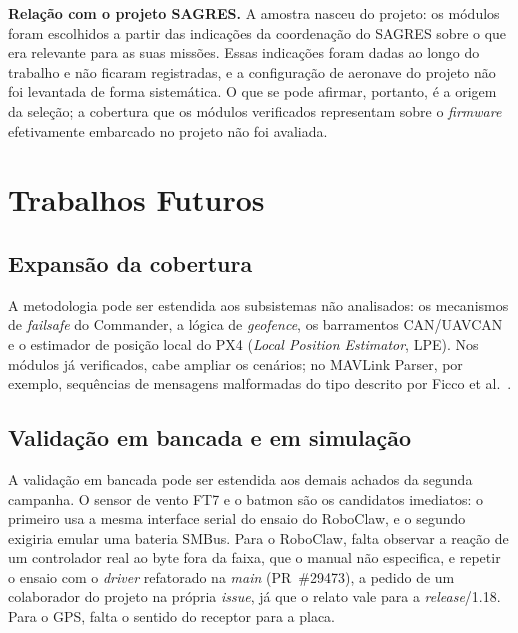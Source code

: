 \textbf{Relação com o projeto SAGRES.} A amostra nasceu do projeto: os módulos
foram escolhidos a partir das indicações da coordenação do SAGRES sobre o que
era relevante para as suas missões. Essas indicações foram dadas ao longo do
trabalho e não ficaram registradas, e a configuração de aeronave do projeto não
foi levantada de forma sistemática. O que se pode afirmar, portanto, é a origem
da seleção; a cobertura que os módulos verificados representam sobre o
\textit{firmware} efetivamente embarcado no projeto não foi avaliada.

\section{Trabalhos Futuros}
\label{sec:conclusao-futuros}

\subsection{Expansão da cobertura}

A metodologia pode ser estendida aos subsistemas não analisados: os mecanismos
de \textit{failsafe} do Commander, a lógica de \textit{geofence}, os barramentos
CAN/UAVCAN e o estimador de posição local do PX4 (\textit{Local Position
Estimator}, LPE). Nos módulos já verificados, cabe ampliar os cenários; no
MAVLink Parser, por exemplo, sequências de mensagens malformadas do tipo
descrito por Ficco et al.~\cite{Ficco2022}.

\subsection{Validação em bancada e em simulação}
\label{sec:trabalhos-futuros-hw}

A validação em bancada pode ser estendida aos demais achados da segunda
campanha. O sensor de vento FT7 e o batmon são os candidatos imediatos: o
primeiro usa a mesma interface serial do ensaio do RoboClaw, e o segundo
exigiria emular uma bateria SMBus. Para o RoboClaw, falta observar a reação de
um controlador real ao byte fora da faixa, que o manual não especifica, e repetir o ensaio
com o \textit{driver} refatorado na \textit{main} (PR~\#29473), a pedido de um colaborador do projeto na própria \textit{issue}, já que o relato vale para a \textit{release}/1.18. Para o
GPS, falta o sentido do receptor para a placa.

